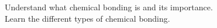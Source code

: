 \documentclass[preview]{standalone}
\begin{document}
Understand what chemical bonding is and its importance.\\Learn the different types of chemical bonding.\\
\end{document}
